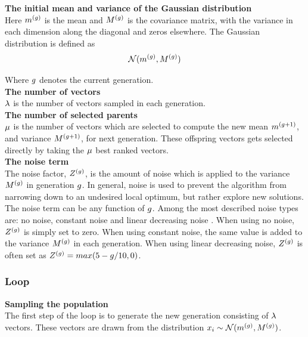 \textbf{The initial mean and variance of the Gaussian distribution} \\
Here $m^{(g)}$ is the mean and  
$M^{(g)}$ is the covariance matrix, with 
the variance in each dimension along the diagonal and zeros elsewhere. 
The Gaussian distribution is defined as 
\begin{align}
\mathcal{N}(m^{(g)},M^{(g)})
\end{align}

Where $g$ denotes the current generation.\\


\textbf{The number of vectors}\\
$\lambda$ is the number of vectors sampled in each generation.
\\

\textbf{The number of selected parents}\\
$\mu$ is the number of vectors which are selected to compute 
the new mean $m^{(g + 1)}$, and variance
$M^{(g + 1)}$, for next generation. 
These offspring vectors gets selected 
directly by taking the $\mu$ best ranked
vectors.
\\

\textbf{The noise term}\\
The noise factor, $Z^{(g)}$, 
is the amount of noise which 
is applied to the variance $M^{(g)}$ in
generation 
$g$. In general, noise is used to prevent
the algorithm from 
narrowing down to an undesired local optimum, but
rather explore new solutions.
The noise term can be any
function of $g$. Among 
the most described noise types are: no noise, constant noise 
and linear decreasing noise \citep{szita:06}. 
When using no noise, $Z^{(g)}$ 
is simply set to zero. When using constant noise, 
the same value is 
added to the variance $M^{(g)}$ 
in each generation. 
When using linear decreasing noise, 
$Z^{(g)}$ is often set as
$Z^{(g)}=max(5- g /10,0)$.
\\

\subsubsection{Loop}

\textbf{Sampling the population}\\
The first step of the loop is to generate the new generation 
consisting of $\lambda$ vectors. 
These vectors are drawn from the distribution 
$x_{i}\sim \mathcal{N}(m^{(g)},M^{(g)})$.
\\


